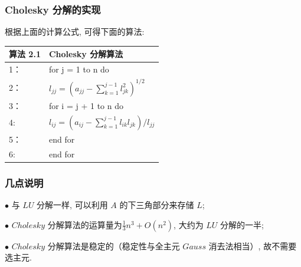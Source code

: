 \documentclass[notheorems,serif]{beamer}
\begin{document}
\begin{frame}
\frametitle{Cholesky 分解的实现}
根据上面的计算公式, 可得下面的算法:

\begin{table}  
	\begin{tabular*}{16cm}{ll}  
		\hline  
		算法 2.1 & Cholesky 分解算法\\  
		\hline  
		1：   & for j = 1 to n do\\  
		2：   & \qquad $l_{j j}=\left(a_{j j}-\sum_{k=1}^{j-1} l_{j k}^{2}\right)^{1 / 2}$\\
		3：   & \qquad for i = j + 1 to n do\\
		4:    & \qquad \qquad$l_{i j}=\left(a_{i j}-\sum_{k=1}^{j-1} l_{i k} l_{j k}\right) / l_{j j}$\\
		5：   & \qquad end for\\
		6:    & end for\\
		\hline  
	\end{tabular*}  
\end{table}
\end{frame}

\begin{frame}
\frametitle{几点说明}
$\bullet$ 与 $LU$ 分解一样, 可以利用 $A$ 的下三角部分来存储 $L$;

$\bullet$ $Cholesky$ 分解算法的运算量为$\frac{1}{3} n^{3}+O\left(n^{2}\right)$, 大约为 $LU$ 分解的一半;

$\bullet$ $Cholesky$ 分解算法是稳定的（稳定性与全主元 $Gauss$ 消去法相当）,
故不需要选主元.
\end{frame}
\end{document}
